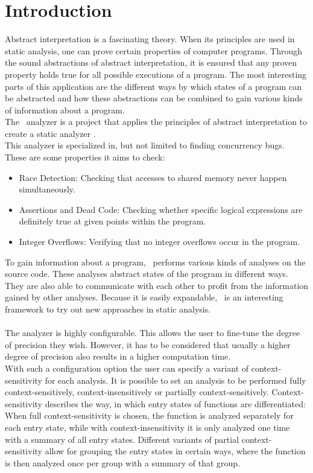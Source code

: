 
\chapter{Introduction}\label{chapter:introduction}
  Abstract interpretation is a fascinating theory. When its principles are used in static analysis, one can prove certain properties of computer programs. Through the sound abstractions of abstract interpretation, it is ensured that any proven property holds true for all possible executions of a program. The most interesting parts of this application are the different ways by which states of a program can be abstracted and how these abstractions can be combined to gain various kinds of information about a program.\\
  The \gob\ analyzer is a project that applies the principles of abstract interpretation to create a static analyzer \parencite{goblintHome}.\\
  This analyzer is specialized in, but not limited to finding concurrency bugs. These are some properties it aims to check:
  \begin{itemize}
    \item Race Detection: Checking that accesses to shared memory never happen simultaneously.
    \item Assertions and Dead Code: Checking whether specific logical expressions are definitely true at given points within the program. 
    \item Integer Overflows: Verifying that no integer overflows occur in the program.
  \end{itemize}
  To gain information about a program, \gob\ performs various kinds of analyses on the source code. These analyses abstract states of the program in different ways. They are also able to communicate with each other to profit from the information gained by other analyses. Because it is easily expandable, \gob\ is an interesting framework to try out new approaches in static analysis.\\
  \\
  The analyzer is highly configurable. This allows the user to fine-tune the degree of precision they wish. However, it has to be considered that usually a higher degree of precision also results in a higher computation time.\\
  With such a configuration option the user can specify a variant of context-sensitivity for each analysis. It is possible to set an analysis to be performed fully context-sensitively, context-insensitively or partially context-sensitively. Context-sensitivity describes the way, in which entry states of functions are differentiated: When full context-sensitivity is chosen, the function is analyzed separately for each entry state, while with context-insensitivity it is only analyzed one time with a summary of all entry states. Different variants of partial context-sensitivity allow for grouping the entry states in certain ways, where the function is then analyzed once per group with a summary of that group.\\
